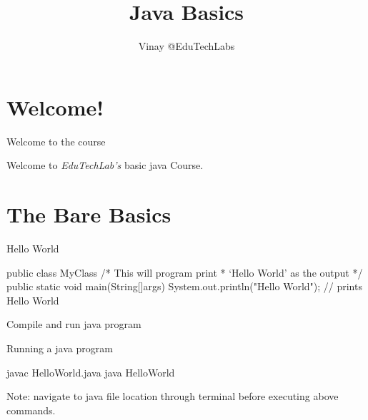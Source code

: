 \documentclass[11pt]{beamer}
\author{Vinay @EduTechLabs}
\title{Java Basics}
\begin{document}
\section{Welcome!}
\frame{\maketitle}
\begin{frame}{Welcome to the course}
	\begin{center}
	 Welcome to \emph{\color{pblue}EduTechLab's} basic java Course.
	\end{center}
\end{frame}


\pycode{%
\begin{java}

\end{java}
}



\section{The Bare Basics}
\begin{frame}[containsverbatim]{Hello World}
\begin{java}
public class MyClass{
/* This will program print 
 * `Hello World' as the output
 */
	public static void main(String[]args){
		System.out.println("Hello World"); 
		// prints Hello World
	}
}
\end{java}
\end{frame}

\begin{frame}[containsverbatim]{Compile and run java program}
	\begin{flushleft}
	
	
		\item{Running a java program} \\
		\begin{java}
		javac HelloWorld.java
		java HelloWorld
		\end{java}
		\item{Note: navigate to java file location through terminal before executing above commands.}
	\end{flushleft}
	
\end{frame}
\end{document}
